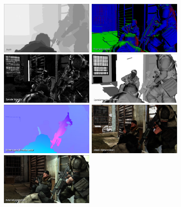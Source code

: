 \begin{figure}[h]
    \centering
    \includegraphics[width=175px]{images/graphics/killzone-2-buffer-depth.png}
    \includegraphics[width=175px]{images/graphics/killzone-2-buffer-vsn.png}
    \includegraphics[width=175px]{images/graphics/killzone-2-buffer-specular.png}
    \includegraphics[width=175px]{images/graphics/killzone-2-buffer-specular-rough.png}
    \includegraphics[width=175px]{images/graphics/killzone-2-buffer-ss-motion.png}
    \includegraphics[width=175px]{images/graphics/killzone-2-buffer-albedo.png}
    \includegraphics[width=175px]{images/graphics/killzone-2-buffer-composed-result.png}

\end{figure}
